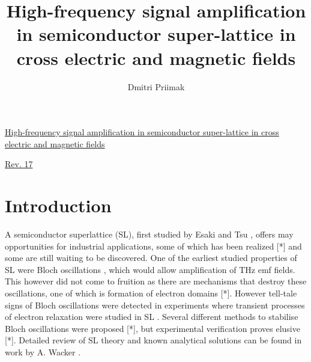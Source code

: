 \documentclass[40pt,letterpaper,physrev]{article}
\author{Dmitri Priimak}
\title{High-frequency signal amplification in semiconductor super-lattice in cross electric and magnetic fields}
\begin{document}

\newcommand{\ddx}[2] {
	\frac{\text{d}#1}{\text{d}#2}
}
\newcommand{\ddt}[1] {
	\frac{\text{d}#1}{\text{d}t}
}
\newcommand{\dtwodt}[1] {
	\frac{\text{d}^{2}#1}{\text{d}t^{2}}
}
 \begin{center}
  \underline{High-frequency signal amplification in semiconductor super-lattice in cross electric and magnetic fields}
 \end{center}
  \begin{center}
    \underline{Rev. 17}
  \end{center}
  \section{Introduction}  
  A semiconductor superlattice (SL), first studied by Esaki and Tsu \cite{Esaki:70}, offers may opportunities for
  industrial 
  applications, some of which has been realized [*] and some are still waiting to be discovered. One of the
  earliest studied properties of SL were Bloch oscillations \cite{BLOCH}, which would allow amplification of 
  THz emf fields. This however did not come to fruition as there are mechanisms that destroy these 
  oscillations, one of
  which is formation of electron domains [*]. However 
  tell-tale signs of Bloch oscillations were detected in experiments where transient processes of electron 
  relaxation were studied in SL \cite{PhysRevB.56.10303}. Several different methods to stabilise Bloch oscillations were proposed [*], 
  but experimental verification proves elusive [*]. Detailed review of SL theory and known analytical solutions 
  can be found in work by A. Wacker \cite{WAC01}.
  
\end{document}
